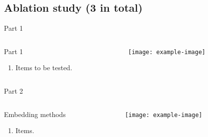 \documentclass[handout,t,aspectratio=1610]{beamer}
\begin{document}
\subsection{Ablation study (3 in total)}
\begin{frame}{Part 1}
    \begin{columns}[T]
       \begin{column}{0.5\textwidth}
           \begin{block}{Part 1}
               \begin{enumerate}
                   \item Items to be tested.
               \end{enumerate}
           \end{block}
       \end{column}

        \hfill

       \begin{column}{0.5\textwidth}
           \begin{center}
               \texttt{[image: example-image]}
           \end{center}
       \end{column}
    \end{columns}

\end{frame}


\begin{frame}{Part 2}
    \begin{columns}[T]
       \begin{column}{0.5\textwidth}
           \begin{block}{Embedding methods}
               \begin{enumerate}
                    \item Items.
               \end{enumerate}
           \end{block}
       \end{column}

        \hfill

       \begin{column}{0.5\textwidth}
           \begin{center}
               \texttt{[image: example-image]}
           \end{center}
       \end{column}
    \end{columns}

\end{frame}
\end{document}
